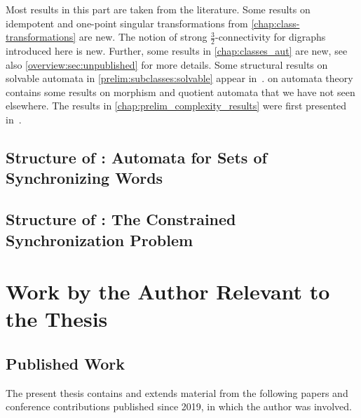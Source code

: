 Most results in this part are taken from the literature.
Some results on idempotent and one-point singular
transformations from \cref{chap:class-transformations}
are new. The notion of strong $\frac{3}{2}$-connectivity
for digraphs introduced here is new. Further, some results in \cref{chap:classes_aut}
are new, see also \cref{overview:sec:unpublished} for more details.
Some structural results on solvable automata in \cref{prelim:subclasses:solvable}
appear in~\cite{DBLP:journals/jalc/000124}.
 on automata theory contains some results
on morphism and quotient automata that we have not seen elsewhere.
The results in \cref{chap:prelim_complexity_results} 
were first presented in~\cite{DBLP:journals/jalc/000124}.

\subsection{Structure of : Automata for Sets of Synchronizing Words} 
\label{intro:outline:orga:sec:autsync}



\subsection{Structure of : The Constrained Synchronization Problem}
\label{intro:outline:orga:sec:csp}



\section{Work by the Author Relevant to the Thesis}
\label{overview:sec:papers} 

\subsection{Published Work}

The present thesis contains and extends material from the following papers and conference contributions published since 2019, in which the author was involved.

